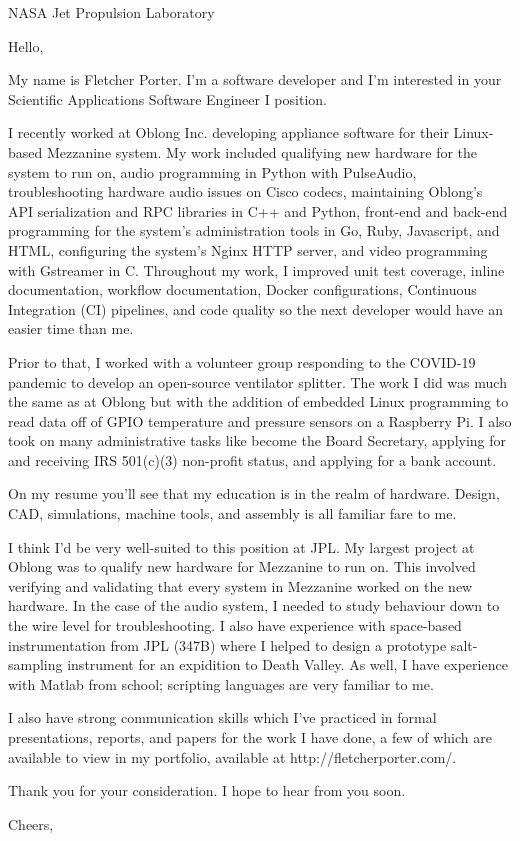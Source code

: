 \documentclass[12pt,american,german,british]{letter}
\begin{document}
\raggedright

\begin{letter}{NASA Jet Propulsion Laboratory}

\opening{Hello,}

My name is Fletcher Porter.  I'm a software developer and I'm interested in
your Scientific Applications Software Engineer I position.

I recently worked at Oblong Inc. developing appliance software for their
Linux-based Mezzanine system.  My work included qualifying new hardware for the
system to run on, audio programming in Python with PulseAudio,
troubleshooting hardware audio issues on Cisco codecs, maintaining Oblong's API
serialization and RPC libraries in C++ and Python, front-end and back-end
programming for the system's administration tools in Go, Ruby, Javascript, and
HTML, configuring the system's Nginx HTTP server, and video programming with
Gstreamer in C.  Throughout my work, I improved unit test coverage, inline
documentation, workflow documentation, Docker configurations, Continuous
Integration (CI) pipelines, and code quality so the next developer would have
an easier time than me.

Prior to that, I worked with a volunteer group responding to the COVID-19
pandemic to develop an open-source ventilator splitter.  The work I did was
much the same as at Oblong but with the addition of embedded Linux programming
to read data off of GPIO temperature and pressure sensors on a Raspberry Pi.  I
also took on many administrative tasks like become the Board Secretary,
applying for and receiving IRS 501(c)(3) non-profit status, and applying for a
bank account.

On my resume you'll see that my education is in the realm of hardware.  Design, 
CAD, simulations, machine tools, and assembly is all familiar fare to me.

I think I'd be very well-suited to this position at JPL.  My largest project at
Oblong was to qualify new hardware for Mezzanine to run on.  This involved
verifying and validating that every system in Mezzanine worked on the new
hardware.  In the case of the audio system, I needed to study behaviour down to
the wire level for troubleshooting.  I also have experience with space-based
instrumentation from JPL (347B) where I helped to design a prototype salt-
sampling instrument for an expidition to Death Valley.  As well, I have
experience with Matlab from school; scripting languages are very familiar to
me.

I also have strong communication skills which I've practiced in formal
presentations, reports, and papers for the work I have done, a few of which are
available to view in my portfolio, available at http://fletcherporter.com/.

Thank you for your consideration.  I hope to hear from you soon.


\closing{Cheers,}

\end{letter}
\end{document}
